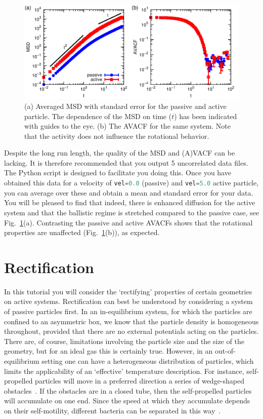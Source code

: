 \documentclass[aip,jcp,reprint,a4paper,onecolumn,amsmath]{revtex4-1}
\newcommand\codees{\lstinline[language=python]}
\begin{document}
\begin{figure}[!htb]
\begin{center}
\includegraphics[scale=0.75]{FIGURES/enhanced}
\end{center}
\caption{\label{fig:enhanced}(a) Averaged MSD with standard error for the passive and active particle. The dependence of the MSD on time ($t$) has been indicated with guides to the eye. (b) The AVACF for the same system. Note that the activity does not influence the rotational behavior.}
\end{figure}

Despite the long run length, the quality of the MSD and (A)VACF can be lacking. It is therefore recommended that you output 5 uncorrelated data files. The Python script is designed to facilitate you doing this. Once you have obtained this data for a velocity of \codees{vel=0.0} (passive) and \codees{vel=5.0} active particle, you can average over these and obtain a mean and standard error for your data. You will be pleased to find that indeed, there is enhanced diffusion for the active system and that the ballistic regime is stretched compared to the passive case, see Fig.~\ref{fig:enhanced}(a). Contrasting the passive and active AVACFs shows that the rotational properties are unaffected (Fig.~\ref{fig:enhanced}(b)), as expected.

\section{\label{sec:rectify}Rectification}

In this tutorial you will consider the `rectifying' properties of certain geometries on active systems. Rectification can best be understood by considering a system of passive particles first. In an in-equilibrium system, for which the particles are confined to an asymmetric box, we know that the particle density is homogeneous throughout, provided that there are no external potentials acting on the particles. There are, of course, limitations involving the particle size and the size of the geometry, but for an ideal gas this is certainly true. However, in an out-of-equilibrium setting one can have a heterogeneous distribution of particles, which limits the applicability of an `effective' temperature description. For instance, self-propelled particles will move in a preferred direction a series of wedge-shaped obstacles~\cite{Berdakin13a}. If the obstacles are in a closed tube, then the self-propelled particles will accumulate on one end. Since the speed at which they accumulate depends on their self-motility, different bacteria can be separated in this way~\cite{Berdakin13b}.
\end{document}
